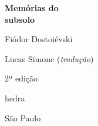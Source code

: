 




\begingroup\thispagestyle{empty}\vspace*{.05\textheight} 

              \formular
              \Huge
              \noindent
              \textbf{Memórias do\\subsolo}

              
              {\brabo\LARGE
              \noindent Fiódor Dostoiévski}
              
              \vfill

              \newfontfamily{}
              \fontsize{30}{40}\selectfont \minion\small
              \noindent Lucas Simone (\textit{tradução})
              
              \vspace{0.5cm}
              
              {\noindent\fontsize{30}{40}\selectfont \minion\small\noindent 2ª edição}

              \vfill
              
              \newfontfamily{}
              {\noindent\fontsize{30}{40}\selectfont\timesnewroman hedra}
              \smallskip
              
              {\selectfont\minion\small
              \noindent São Paulo \quad\the\year}

\endgroup
\pagebreak
